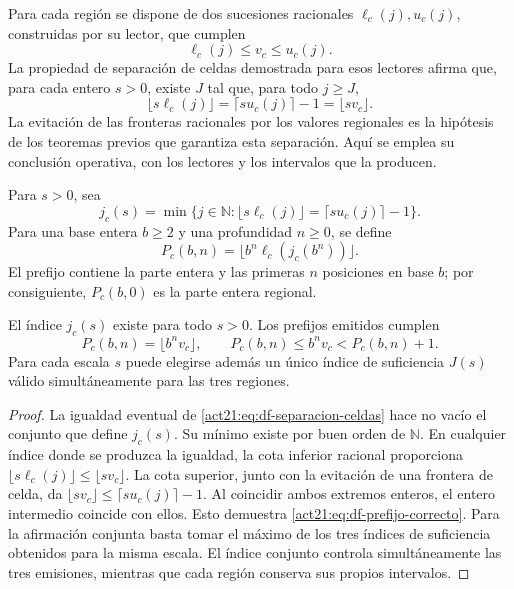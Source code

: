 Para cada región se dispone de dos sucesiones racionales
\(\ell_c(j),u_c(j)\), construidas por su lector, que cumplen
\[
 \ell_c(j)\leq v_c\leq u_c(j).
\]
La propiedad de separación de celdas demostrada para esos lectores afirma
que, para cada entero \(s>0\), existe \(J\) tal que, para todo \(j\geq J\),
\begin{equation}
 \lfloor s\ell_c(j)\rfloor
 =\lceil su_c(j)\rceil-1
 =\lfloor sv_c\rfloor.
 \label{act21:eq:df-separacion-celdas}
\end{equation}
La evitación de las fronteras racionales por los valores regionales es la
hipótesis de los teoremas previos que garantiza esta separación. Aquí se
emplea su conclusión operativa, con los lectores y los intervalos que la
producen.

\begin{definition}
Para \(s>0\), sea
\[
 j_c(s)=\min\{j\in\mathbb N:
 \lfloor s\ell_c(j)\rfloor=\lceil su_c(j)\rceil-1\}.
\]
Para una base entera \(b\geq2\) y una profundidad \(n\geq0\), se define
\begin{equation}
 P_c(b,n)=\lfloor b^n\ell_c(j_c(b^n))\rfloor.
 \label{act21:eq:df-publicacion-prefijo}
\end{equation}
El prefijo contiene la parte entera y las primeras \(n\) posiciones en base
\(b\); por consiguiente, \(P_c(b,0)\) es la parte entera regional.
\end{definition}

\begin{theorem}
\label{act21:thm:df-emision-correcta}
El índice \(j_c(s)\) existe para todo \(s>0\). Los prefijos emitidos cumplen
\begin{equation}
 P_c(b,n)=\lfloor b^n v_c\rfloor,
 \qquad
 P_c(b,n)\leq b^n v_c<P_c(b,n)+1.
 \label{act21:eq:df-prefijo-correcto}
\end{equation}
Para cada escala \(s\) puede elegirse además un único índice de suficiencia
\(J(s)\) válido simultáneamente para las tres regiones.
\end{theorem}

\begin{proof}
La igualdad eventual de \eqref{act21:eq:df-separacion-celdas} hace no vacío el
conjunto que define \(j_c(s)\). Su mínimo existe por buen orden de
\(\mathbb N\). En cualquier índice donde se produzca la igualdad, la cota
inferior racional proporciona
\(\lfloor s\ell_c(j)\rfloor\leq\lfloor sv_c\rfloor\).
La cota superior, junto con la evitación de una frontera de celda, da
\(\lfloor sv_c\rfloor\leq\lceil su_c(j)\rceil-1\).
Al coincidir ambos extremos enteros, el entero intermedio coincide con
ellos. Esto demuestra \eqref{act21:eq:df-prefijo-correcto}. Para la afirmación
conjunta basta tomar el máximo de los tres índices de suficiencia obtenidos
para la misma escala. El índice conjunto controla simultáneamente las tres
emisiones, mientras que cada región conserva sus propios intervalos.
\end{proof}

